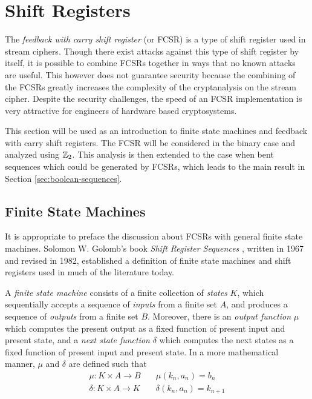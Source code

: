 \section{Shift Registers}\label{sec:shift-registers}
\par The {\it feedback with carry shift register} (or FCSR) is a type of
shift register used in stream ciphers. Though there exist attacks against
this type of shift register by itself, it is possible to combine FCSRs
together in ways that no known attacks are useful. This however does not
guarantee security because the combining of the FCSRs greatly increases the
complexity of the cryptanalysis on the stream cipher. Despite the security
challenges, the speed of an FCSR implementation is very attractive for
engineers of hardware based cryptosystems.

\par This section will be used as an introduction to finite state machines
and feedback with carry shift registers. The FCSR will be considered in the
binary case and analyzed using $\mathbb{Z}_2$. This analysis is then extended to
the case when bent sequences which could be generated by FCSRs, which leads to
the main result in Section \ref{sec:boolean-sequences}.

\subsection{Finite State Machines}
\par It is appropriate to preface the discussion about FCSRs with general finite
state machines. Solomon W. Golomb's book {\em Shift Register Sequences}
\cite{bk:g82}, written in 1967 and revised in 1982, established a definition of
finite state machines and shift registers used in much of the literature today.

\begin{definition}\label{finite-state-machine}
  A {\em finite state machine} consists of a finite collection of {\em states}
  $K$, which sequentially accepts a sequence of {\em inputs} from a finite set
  $A$, and produces a sequence of {\em outputs} from a finite set
  $B$. Moreover, there is an {\em output function} $\mu$ which computes
  the present output as a fixed function of present input and present state,
  and a
  {\em next state function} $\delta$ which computes the next states as a fixed
  function of present input and present state. In a more mathematical manner,
  $\mu$ and $\delta$ are defined such that
  \begin{eqnarray}
    \mu:K \times A \rightarrow B \quad &\mu(k_n,a_n)=b_n \\
    \delta:K \times A \rightarrow K \quad &\delta(k_n,a_n)=k_{n+1}
  \end{eqnarray}
\end{definition}

